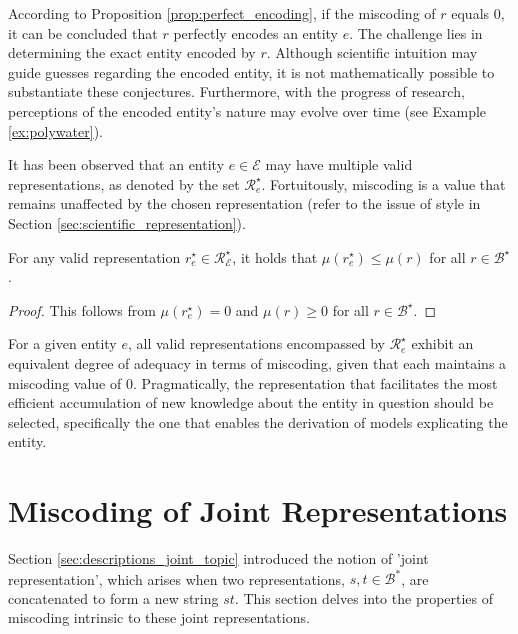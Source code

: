 According to Proposition \ref{prop:perfect_encoding}, if the miscoding of $r$ equals 0, it can be concluded that $r$ perfectly encodes an entity $e$. The challenge lies in determining the exact entity encoded by $r$. Although scientific intuition may guide guesses regarding the encoded entity, it is not mathematically possible to substantiate these conjectures. Furthermore, with the progress of research, perceptions of the encoded entity's nature may evolve over time (see Example \ref{ex:polywater}).

It has been observed that an entity $e \in \mathcal{E}$ may have multiple valid representations, as denoted by the set $\mathcal{R}^\star_e$. Fortuitously, miscoding is a value that remains unaffected by the chosen representation (refer to the issue of style in Section \ref{sec:scientific_representation}).

\begin{proposition}
For any valid representation $r^\star_e \in \mathcal{R}^\star_\mathcal{E}$, it holds that $\mu\left( r^\star_e \right) \leq \mu\left( r \right)$ for all $r \in \mathcal{B}^\star$.
\end{proposition}
\begin{proof}
This follows from $\mu\left( r^\star_e \right) = 0$ and $\mu\left( r \right) \geq 0$ for all $r \in \mathcal{B}^\star$.
\end{proof}

For a given entity $e$, all valid representations encompassed by $\mathcal{R}^\star_e$ exhibit an equivalent degree of adequacy in terms of miscoding, given that each maintains a miscoding value of $0$. Pragmatically, the representation that facilitates the most efficient accumulation of new knowledge about the entity in question should be selected, specifically the one that enables the derivation of models explicating the entity.

%
%

\section{Miscoding of Joint Representations}
\label{sec:joint_miscoding}

Section \ref{sec:descriptions_joint_topic} introduced the notion of 'joint representation', which arises when two representations, $s, t \in \mathcal{B}^\ast$, are concatenated to form a new string $st$. This section delves into the properties of miscoding intrinsic to these joint representations.


